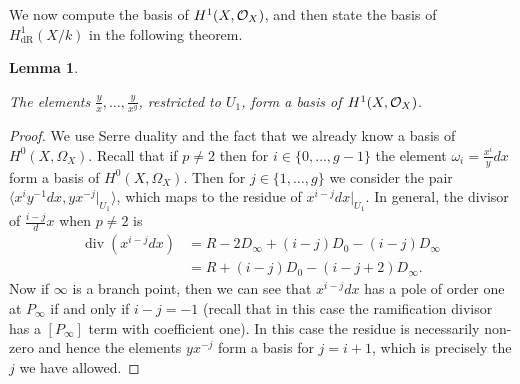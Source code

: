 \documentclass[draft, 11pt]{article} %
\theoremstyle{plain}
\newtheorem{lem}[defn]{Lemma}
\theoremstyle{remark}
\newcommand{\cO}{{\cal O}}
\newcommand{\hzero}{{H^0(X,\Omega_X)}}
\newcommand{\derhamhone}{H_{\text {dR}}^1(X/k)}
\DeclareMathOperator{\di}{div}
\begin{document}
We now compute the basis of $H^1(X,\cO_X)$, and then state the basis of $\derhamhone$ in the following theorem.\\
\begin{lem}\label{basish1}
 
 The elements $\frac{y}{x}, \ldots , \frac{y}{x^g}$, restricted to $U_1$, form a basis of $H^1(X,\cO_X)$.
 
\end{lem}
\begin{proof}
We use Serre duality and the fact that we already know a basis of $\hzero$.
Recall that if $p\neq 2$ then for $i \in \{0,\ldots, g-1\}$ the element $\omega_i = \frac{x^i}{y}dx$ form a basis of $\hzero$.
Then for $j\in \{1, \ldots, g\}$  we consider the pair $\langle x^iy^{-1}dx, yx^{-j}|_{U_1}\rangle$, which maps to the residue of $x^{i-j}dx|_{U_1}$.
In general, the divisor of $\frac{i-j}dx$ when $p\neq 2$ is
\begin{equation}\label{residuedivisor}
\begin{split}
\di(x^{i-j}dx) & = R - 2D_\infty +(i-j)D_0 - (i-j)D_\infty \\
& = R + (i-j)D_0 - (i-j+2)D_\infty.
\end{split}
\end{equation}
Now if $\infty$ is a branch point, then we can see that $x^{i-j}dx$ has a pole of order one at $P_\infty$ if and only if $i-j = -1$ (recall that in this case the ramification divisor has a $[P_\infty]$ term with coefficient one).
In this case the residue is necessarily non-zero and hence the elements $yx^{-j}$ form a basis for $j= i+1$, which is precisely the $j$ we have allowed.


\end{proof}
\end{document}
